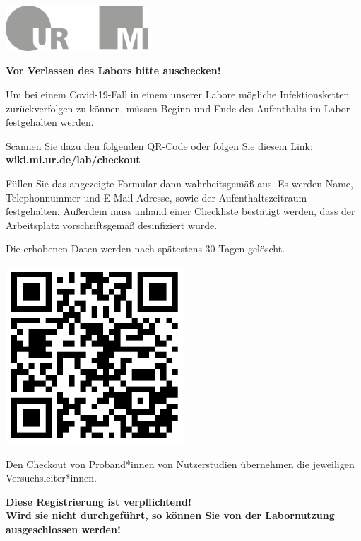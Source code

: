 \documentclass[24pt, a4paper, portrait]{article}
\begin{document}
\pagestyle{empty}

\raggedleft

\includegraphics[width=0.4\textwidth]{logo}

\vspace{1cm}
\sffamily
\centering
\huge

\textbf{Vor Verlassen des Labors bitte auschecken!}

\vspace{1cm}

\raggedright
\Large

Um bei einem Covid-19-Fall in einem unserer Labore mögliche Infektionsketten zurückverfolgen zu können, müssen Beginn und Ende des Aufenthalts im Labor festgehalten werden.

\medskip

Scannen Sie dazu den folgenden QR-Code oder folgen Sie diesem Link: \textbf{wiki.mi.ur.de/lab/checkout}

\medskip

Füllen Sie das angezeigte Formular dann wahrheitsgemäß aus.
Es werden Name, Telephonnummer und E-Mail-Adresse, sowie der Aufenthaltszeitraum festgehalten.
Außerdem muss anhand einer Checkliste bestätigt werden, dass der Arbeitsplatz vorschriftsgemäß desinfiziert wurde.

Die erhobenen Daten werden nach spätestens 30 Tagen gelöscht.

\vspace{1cm}
\centering
\includegraphics[width=0.5\textwidth]{qr_checkout}

\vspace{1cm}
\raggedright
Den Checkout von Proband*innen von Nutzerstudien übernehmen die jeweiligen Versuchsleiter*innen.

\vspace{5mm}
\centering
\huge
\textbf{Diese Registrierung ist verpflichtend! \\ Wird sie nicht durchgeführt, so können Sie von der Labornutzung ausgeschlossen werden!}
\end{document}
